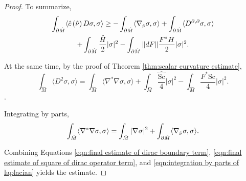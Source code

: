 \documentclass[10pt,a4paper]{amsart}
\newcommand{\Sc}{\mathrm{Sc}}
\newcommand{\bnd}[1]{\partial #1}
\newcommand{\cbar}[1]{\dom{c}\left(#1\right)}
\newcommand{\dom}[1]{\hat{#1}}
\newcommand{\inner}[1]{\langle #1 \rangle}
\newcommand{\onorm}[1]{\Vert #1 \Vert}
\newcommand{\pnorm}[1]{| #1 |}
\begin{document}
\begin{proof}
    To summarize,
    \begin{multline}\label{eqn:final estimate of dirac boundary term}
        \int_{\bnd{\dom{M}}} \inner{\cbar{\dom{\nu}} D \sigma, \sigma} \geq -\int_{\bnd{\dom{M}}} \inner{\conn[]_{\dom{\nu}} \sigma, \sigma} + \int_{\bnd{\dom{M}}} \inner{D^{\partial, \partial}\sigma, \sigma}\\
        + \int_{\bnd{\dom{M}}} \frac{\dom{H}}{2} \pnorm{\sigma}^2 - \int_{\bnd{\dom{M}}} \onorm{dF} \frac{F^*H}{2} \pnorm{\sigma}^2.
    \end{multline}

    At the same time, by the proof of Theorem \ref{thm:scalar curvature estimate},
    \begin{equation}\label{eqn:final estimate of square of dirac operator term}
        \int_{\dom{M}} \inner{D^2 \sigma, \sigma} = \int_{\dom{M}} \inner{\nabla^*\nabla \sigma, \sigma} + \int_{\dom{M}} \frac{\dom{\Sc}}{4} \pnorm{\sigma}^2 - \int_{\dom{M}} \frac{F^*\Sc}{4} \pnorm{\sigma}^2.
    \end{equation}.

    Integrating by parts,
    \begin{equation}\label{eqn:integration by parts of laplacian}
        \int_{\dom{M}} \inner{\nabla^*\nabla \sigma, \sigma} = \int_{\dom{M}} \pnorm{\conn[] \sigma}^2 + \int_{\bnd{\dom{M}}} \inner{\conn[]_{\dom{\nu}} \sigma, \sigma}.
    \end{equation}

    Combining Equations \eqref{eqn:final estimate of dirac boundary term}, \eqref{eqn:final estimate of square of dirac operator term}, and \eqref{eqn:integration by parts of laplacian} yields the estimate.
\end{proof}
\end{document}
